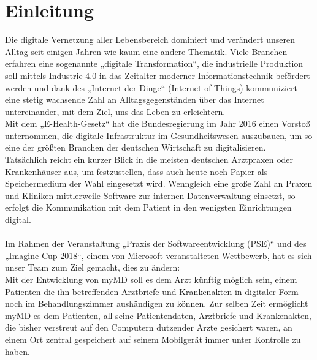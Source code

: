 \documentclass[a4paper]{scrreprt}
\begin{document}
\section{Einleitung}
Die digitale Vernetzung aller Lebensbereich dominiert und verändert unseren Alltag seit einigen Jahren wie kaum eine andere Thematik. Viele Branchen erfahren eine sogenannte „digitale Transformation“, die industrielle Produktion soll mittels Industrie 4.0 in das Zeitalter moderner Informationstechnik befördert werden und dank des „Internet der Dinge“ (Internet of Things) kommuniziert eine stetig wachsende Zahl an Alltagsgegenständen über das Internet untereinander, mit dem Ziel, uns das Leben zu erleichtern.\\
Mit dem „E-Health-Gesetz“ hat die Bundesregierung im Jahr 2016 einen Vorstoß unternommen, die digitale Infrastruktur im Gesundheitswesen auszubauen, um so eine der größten Branchen der deutschen Wirtschaft zu digitalisieren.\\
Tatsächlich reicht ein kurzer Blick in die meisten deutschen Arztpraxen oder Krankenhäuser aus, um festzustellen, dass auch heute noch Papier als Speichermedium der Wahl eingesetzt wird. Wenngleich eine große Zahl an Praxen und Kliniken mittlerweile Software zur internen Datenverwaltung einsetzt, so erfolgt die Kommunikation mit dem Patient in den wenigsten Einrichtungen digital.\\
~\\
Im Rahmen der Veranstaltung „Praxis der Softwareentwicklung (PSE)“ und des „Imagine Cup 2018“, einem von Microsoft veranstalteten Wettbewerb, hat es sich unser Team zum Ziel gemacht, dies zu ändern:\\
Mit der Entwicklung von myMD soll es dem Arzt künftig möglich sein, einem Patienten die ihn betreffenden Arztbriefe und Krankenakten in digitaler Form noch im Behandlungszimmer aushändigen zu können. 
Zur selben Zeit ermöglicht myMD es dem Patienten, all seine Patientendaten, Arztbriefe und Krankenakten, die bisher verstreut auf den Computern dutzender Ärzte gesichert waren, an einem Ort zentral gespeichert auf seinem Mobilgerät immer unter Kontrolle zu haben. 
\end{document}
